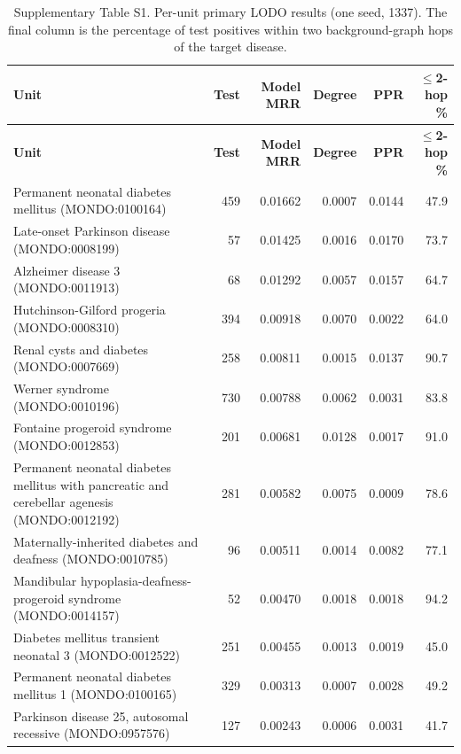 \documentclass[11pt]{article}
\begin{document}
\small
\begin{longtable}{@{}p{4.6cm} r r r r r@{}}
\caption{Supplementary Table S1. Per-unit primary LODO results (one seed, 1337). The final column is the percentage of test positives within two background-graph hops of the target disease.}\\
\toprule
\textbf{Unit} & \textbf{Test} & \textbf{Model MRR} & \textbf{Degree} & \textbf{PPR} & \textbf{$\leq$2-hop \%} \\
\midrule
\endfirsthead
\toprule
\textbf{Unit} & \textbf{Test} & \textbf{Model MRR} & \textbf{Degree} & \textbf{PPR} & \textbf{$\leq$2-hop \%} \\
\midrule
\endhead
Permanent neonatal diabetes mellitus (MONDO:0100164) & 459 & 0.01662 & 0.0007 & 0.0144 & 47.9 \\
Late-onset Parkinson disease (MONDO:0008199) & 57 & 0.01425 & 0.0016 & 0.0170 & 73.7 \\
Alzheimer disease 3 (MONDO:0011913) & 68 & 0.01292 & 0.0057 & 0.0157 & 64.7 \\
Hutchinson-Gilford progeria (MONDO:0008310) & 394 & 0.00918 & 0.0070 & 0.0022 & 64.0 \\
Renal cysts and diabetes (MONDO:0007669) & 258 & 0.00811 & 0.0015 & 0.0137 & 90.7 \\
Werner syndrome (MONDO:0010196) & 730 & 0.00788 & 0.0062 & 0.0031 & 83.8 \\
Fontaine progeroid syndrome (MONDO:0012853) & 201 & 0.00681 & 0.0128 & 0.0017 & 91.0 \\
Permanent neonatal diabetes mellitus with pancreatic and cerebellar agenesis (MONDO:0012192) & 281 & 0.00582 & 0.0075 & 0.0009 & 78.6 \\
Maternally-inherited diabetes and deafness (MONDO:0010785) & 96 & 0.00511 & 0.0014 & 0.0082 & 77.1 \\
Mandibular hypoplasia-deafness-progeroid syndrome (MONDO:0014157) & 52 & 0.00470 & 0.0018 & 0.0018 & 94.2 \\
Diabetes mellitus transient neonatal 3 (MONDO:0012522) & 251 & 0.00455 & 0.0013 & 0.0019 & 45.0 \\
Permanent neonatal diabetes mellitus 1 (MONDO:0100165) & 329 & 0.00313 & 0.0007 & 0.0028 & 49.2 \\
Parkinson disease 25, autosomal recessive (MONDO:0957576) & 127 & 0.00243 & 0.0006 & 0.0031 & 41.7 \\
\bottomrule
\end{longtable}
\end{document}
